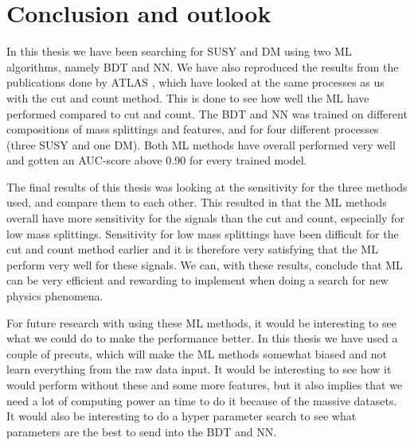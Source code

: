 \chapter{Conclusion and outlook}
\label{sec:Conclusion}

In this thesis we have been searching for SUSY and DM using two ML algorithms, namely BDT and NN. We have also reproduced the results from the publications done by ATLAS \cite{sleptonexclusion, monoZexclusion}, which have looked at the same processes as us with the cut and count method. This is done to see how well the ML have performed compared to cut and count. The BDT and NN was trained on different compositions of mass splittings and features, and for four different processes (three SUSY and one DM). Both ML methods have overall performed very well and gotten an AUC-score above 0.90 for every trained model. 

The final results of this thesis was looking at the sensitivity for the three methods used, and compare them to each other. This resulted in that the ML methods overall have more sensitivity for the signals than the cut and count, especially for low mass splittings. Sensitivity for low mass splittings have been difficult for the cut and count method earlier and it is therefore very satisfying that the ML perform very well for these signals. We can, with these results, conclude that ML can be very efficient and rewarding to implement when doing a search for new physics phenomena. 

For future research with using these ML methods, it would be interesting to see what we could do to make the performance better. In this thesis we have used a couple of precuts, which will make the ML methods somewhat biased and not learn everything from the raw data input. It would be interesting to see how it would perform without these and some more features, but it also implies that we need a lot of computing power an time to do it because of the massive datasets. It would also be interesting to do a hyper parameter search to see what parameters are the best to send into the BDT and NN. 







\begin{comment}


Konklusjon:
- ML mer sensitiv
- Si kort om hva som er gjort


Outlook:
- No precuts
- Hyperparameter søk
- Anomaly detection
- Andre/flere features
- 


\end{comment}
